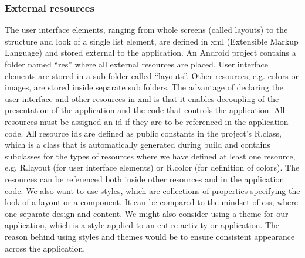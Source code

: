 \subsubsection{External resources}
The user interface elements, ranging from whole screens (called layouts) to the structure and look of a single list element, are defined in \gls{xml} (Extensible Markup Language) and stored external to the application. An Android project contains a folder named “res” where all external resources are placed. User interface elements are stored in a sub folder called “layouts”. Other resources, e.g. colors or images, are stored inside separate sub folders. The advantage of declaring the user interface and other resources in \gls{xml} is that it enables decoupling of the presentation of the application and the code that controls the application.
\newline
\newline
All resources must be assigned an \gls{id} if they are to be referenced in the application code. All resource \gls{id}s are defined as public constants in the project's R.class, which is a class that is automatically generated during build and contains subclasses for the types of resources where we have defined at least one resource, e.g. R.layout (for user interface elements) or R.color (for definition of colors). The resources can be referenced both inside other resources and in the application code.
\newline
\newline
We also want to use styles, which are collections of properties specifying the look of a layout or a component. It can be compared to the mindset of \gls{css}, where one separate design and content. We might also consider using a theme for our application, which is a style applied to an entire activity or application. The reason behind using styles and themes would be to ensure consistent appearance across the application. 

